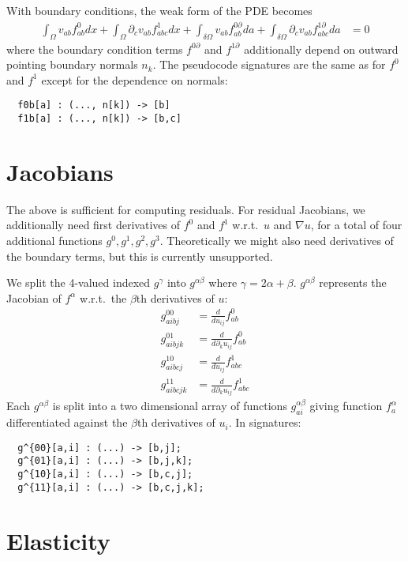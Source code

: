 \documentclass[11pt]{article}
\newcommand{\p}[1]{\partial_{#1}}
\begin{document}
With boundary conditions, the weak form of the PDE becomes
\begin{align*}
  \int_{\Omega} v_{ab} f^0_{ab} dx
    + \int_{\Omega} \p{c} v_{ab} f^1_{abc} dx
    + \int_{\delta \Omega} v_{ab} f^{0\p{}}_{ab} da
    + \int_{\delta \Omega} \p{c} v_{ab} f^{1\p{}}_{abc} da
   &= 0
\end{align*}
where the boundary condition terms $f^{0\p{}}$ and $f^{1\p{}}$ additionally depend on
outward pointing boundary normals $n_k$.  The pseudocode signatures are the same
as for $f^0$ and $f^1$ except for the dependence on normals:
\begin{verbatim}
  f0b[a] : (..., n[k]) -> [b]
  f1b[a] : (..., n[k]) -> [b,c]
\end{verbatim}

\section{Jacobians}

The above is sufficient for computing residuals.  For residual Jacobians, we additionally need
first derivatives of $f^0$ and $f^1$ w.r.t.\ $u$ and $\nabla u$, for a total of four additional
functions $g^0, g^1, g^2, g^3$.  Theoretically we might also need derivatives of the boundary
terms, but this is currently unsupported.

We split the 4-valued indexed $g^\gamma$ into $g^{\alpha\beta}$ where
$\gamma = 2\alpha+\beta$.  $g^{\alpha\beta}$ represents the Jacobian of $f^\alpha$ w.r.t.\
the $\beta$th derivatives of $u$:
\begin{align*}
  g^{00}_{aibj}  &= \frac{d}{du_{ij}} f^0_{ab} \\
  g^{01}_{aibjk} &= \frac{d}{d\p{k}u_{ij}} f^0_{ab} \\
  g^{10}_{aibcj} &= \frac{d}{du_{ij}} f^1_{abc} \\
  g^{11}_{aibcjk} &= \frac{d}{d\p{k}u_{ij}} f^1_{abc}
\end{align*}
Each $g^{\alpha\beta}$ is split into a two dimensional array of functions $g^{\alpha\beta}_{ai}$
giving function $f^\alpha_a$ differentiated against the $\beta$th derivatives of $u_i$.  In signatures:
\begin{verbatim}
  g^{00}[a,i] : (...) -> [b,j];
  g^{01}[a,i] : (...) -> [b,j,k];
  g^{10}[a,i] : (...) -> [b,c,j];
  g^{11}[a,i] : (...) -> [b,c,j,k];
\end{verbatim}

\section{Elasticity}
\end{document}
